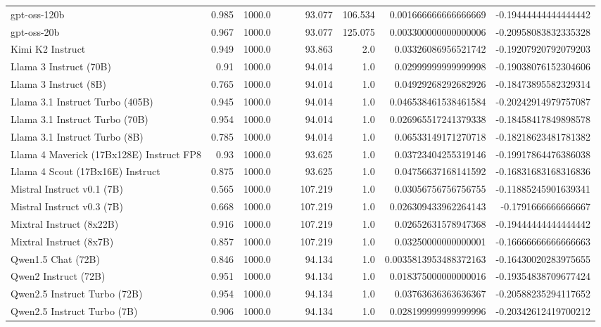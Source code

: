 \begin{table}[htp]
{\begin{tabular}{lrrrrrrrr}
gpt-oss-120b & 0.985 & 1000.0 &  &  & 93.077 & 106.534 & 0.001666666666666669 & -0.19444444444444442 \\
gpt-oss-20b & 0.967 & 1000.0 &  &  & 93.077 & 125.075 & 0.003300000000000006 & -0.20958083832335328 \\
Kimi K2 Instruct & 0.949 & 1000.0 &  &  & 93.863 & 2.0 & 0.03326086956521742 & -0.19207920792079203 \\
Llama 3 Instruct (70B) & 0.91 & 1000.0 &  &  & 94.014 & 1.0 & 0.02999999999999998 & -0.19038076152304606 \\
Llama 3 Instruct (8B) & 0.765 & 1000.0 &  &  & 94.014 & 1.0 & 0.04929268292682926 & -0.18473895582329314 \\
Llama 3.1 Instruct Turbo (405B) & 0.945 & 1000.0 &  &  & 94.014 & 1.0 & 0.046538461538461584 & -0.20242914979757087 \\
Llama 3.1 Instruct Turbo (70B) & 0.954 & 1000.0 &  &  & 94.014 & 1.0 & 0.026965517241379338 & -0.18458417849898578 \\
Llama 3.1 Instruct Turbo (8B) & 0.785 & 1000.0 &  &  & 94.014 & 1.0 & 0.06533149171270718 & -0.18218623481781382 \\
Llama 4 Maverick (17Bx128E) Instruct FP8 & 0.93 & 1000.0 &  &  & 93.625 & 1.0 & 0.03723404255319146 & -0.19917864476386038 \\
Llama 4 Scout (17Bx16E) Instruct & 0.875 & 1000.0 &  &  & 93.625 & 1.0 & 0.04756637168141592 & -0.16831683168316836 \\
Mistral Instruct v0.1 (7B) & 0.565 & 1000.0 &  &  & 107.219 & 1.0 & 0.03056756756756755 & -0.11885245901639341 \\
Mistral Instruct v0.3 (7B) & 0.668 & 1000.0 &  &  & 107.219 & 1.0 & 0.026309433962264143 & -0.1791666666666667 \\
Mixtral Instruct (8x22B) & 0.916 & 1000.0 &  &  & 107.219 & 1.0 & 0.02652631578947368 & -0.19444444444444442 \\
Mixtral Instruct (8x7B) & 0.857 & 1000.0 &  &  & 107.219 & 1.0 & 0.03250000000000001 & -0.16666666666666663 \\
Qwen1.5 Chat (72B) & 0.846 & 1000.0 &  &  & 94.134 & 1.0 & 0.0035813953488372163 & -0.16430020283975655 \\
Qwen2 Instruct (72B) & 0.951 & 1000.0 &  &  & 94.134 & 1.0 & 0.018375000000000016 & -0.19354838709677424 \\
Qwen2.5 Instruct Turbo (72B) & 0.954 & 1000.0 &  &  & 94.134 & 1.0 & 0.03763636363636367 & -0.20588235294117652 \\
Qwen2.5 Instruct Turbo (7B) & 0.906 & 1000.0 &  &  & 94.134 & 1.0 & 0.028199999999999996 & -0.20342612419700212 \\

\end{tabular}}
\end{table}
